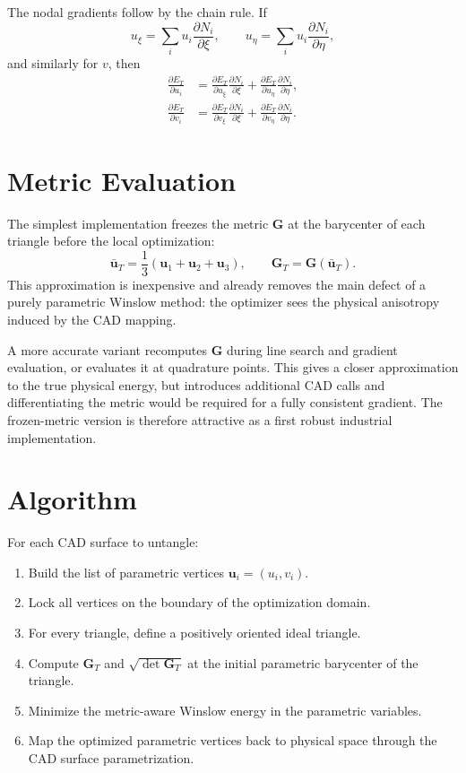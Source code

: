 \documentclass[11pt]{article}
\newcommand{\bu}{\bm{u}}
\newcommand{\bG}{\bm{G}}
\begin{document}
The nodal gradients follow by the chain rule. If
\[
  u_\xi = \sum_i u_i \frac{\partial N_i}{\partial \xi},
  \qquad
  u_\eta = \sum_i u_i \frac{\partial N_i}{\partial \eta},
\]
and similarly for \(v\), then
\[
\begin{aligned}
  \frac{\partial E_T}{\partial u_i}
  &=
  \frac{\partial E_T}{\partial u_\xi}
  \frac{\partial N_i}{\partial \xi}
  +
  \frac{\partial E_T}{\partial u_\eta}
  \frac{\partial N_i}{\partial \eta},\\
  \frac{\partial E_T}{\partial v_i}
  &=
  \frac{\partial E_T}{\partial v_\xi}
  \frac{\partial N_i}{\partial \xi}
  +
  \frac{\partial E_T}{\partial v_\eta}
  \frac{\partial N_i}{\partial \eta}.
\end{aligned}
\]

\section{Metric Evaluation}

The simplest implementation freezes the metric \(\bG\) at the barycenter of
each triangle before the local optimization:
\[
  \bar{\bu}_T =
  \frac{1}{3}(\bu_1+\bu_2+\bu_3),
  \qquad
  \bG_T = \bG(\bar{\bu}_T).
\]
This approximation is inexpensive and already removes the main defect of a
purely parametric Winslow method: the optimizer sees the physical anisotropy
induced by the CAD mapping.

A more accurate variant recomputes \(\bG\) during line search and gradient
evaluation, or evaluates it at quadrature points. This gives a closer
approximation to the true physical energy, but introduces additional CAD calls
and differentiating the metric would be required for a fully consistent
gradient. The frozen-metric version is therefore attractive as a first robust
industrial implementation.

\section{Algorithm}

For each CAD surface to untangle:
\begin{enumerate}
  \item Build the list of parametric vertices \(\bu_i=(u_i,v_i)\).
  \item Lock all vertices on the boundary of the optimization domain.
  \item For every triangle, define a positively oriented ideal triangle.
  \item Compute \(\bG_T\) and \(\sqrt{\det\bG_T}\) at the initial parametric
        barycenter of the triangle.
  \item Minimize the metric-aware Winslow energy in the parametric variables.
  \item Map the optimized parametric vertices back to physical space through
        the CAD surface parametrization.
\end{enumerate}
\end{document}
